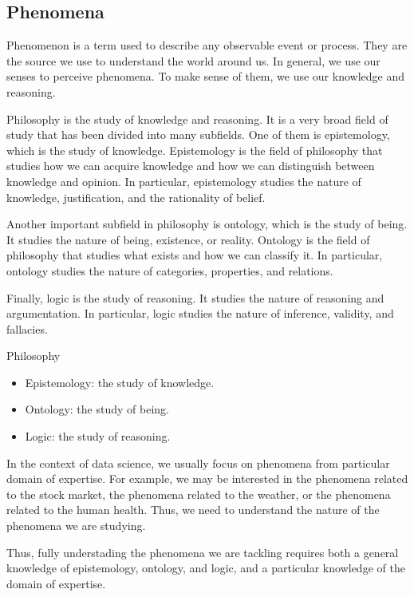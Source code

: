 \subsection{Phenomena}

Phenomenon is a term used to describe any observable event or process.  They are the
source we use to understand the world around us.  In general, we use our senses to
perceive phenomena.  To make sense of them, we use our knowledge and reasoning.

Philosophy is the study of knowledge and reasoning.  It is a very broad field of study
that has been divided into many subfields.  One of them is epistemology, which is the
study of knowledge.  Epistemology is the field of philosophy that studies how we can
acquire knowledge and how we can distinguish between knowledge and opinion.  In
particular, epistemology studies the nature of knowledge, justification, and the
rationality of belief.

Another important subfield in philosophy is ontology, which is the study of being.  It
studies the nature of being, existence, or reality.  Ontology is the field of philosophy
that studies what exists and how we can classify it.  In particular, ontology studies the
nature of categories, properties, and relations.

Finally, logic is the study of reasoning.  It studies the nature of reasoning and
argumentation.  In particular, logic studies the nature of inference, validity, and
fallacies.

\begin{mainbox}{Philosophy}
  \begin{itemize}
    \item Epistemology: the study of knowledge.
    \item Ontology: the study of being.
    \item Logic: the study of reasoning.
  \end{itemize}
\end{mainbox}

In the context of data science, we usually focus on phenomena from particular domain of
expertise.  For example, we may be interested in the phenomena related to the stock
market, the phenomena related to the weather, or the phenomena related to the human
health.  Thus, we need to understand the nature of the phenomena we are studying.

Thus, fully understading the phenomena we are tackling requires both a general knowledge
of epistemology, ontology, and logic, and a particular knowledge of the domain of
expertise.

